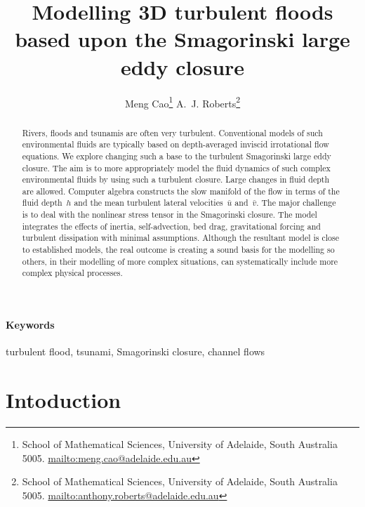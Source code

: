 \documentclass[12pt,a5paper]{article}
\title{Modelling 3D turbulent floods based upon the Smagorinski large eddy closure}
\author{Meng Cao\thanks{School of Mathematical Sciences,
University of Adelaide, South Australia 5005.  \protect\url{mailto:meng.cao@adelaide.edu.au}}
\qquad 
A.~J. Roberts\thanks{School of Mathematical Sciences,
University of Adelaide, South Australia 5005.  \protect\url{mailto:anthony.roberts@adelaide.edu.au}}}
\begin{document}
    
\maketitle

\begin{abstract}
Rivers, floods and tsunamis are often very turbulent. Conventional models of such environmental fluids are typically based on depth-averaged inviscid irrotational flow equations. We explore changing such a base to the turbulent Smagorinski large eddy closure. The aim is to more appropriately model the fluid dynamics of such complex environmental fluids by using such a turbulent closure. Large changes in fluid depth are allowed. Computer algebra constructs the slow manifold of the flow in terms of the fluid depth~$h$ and the mean turbulent lateral velocities~$\bar u$ and~$\bar v$. The major challenge is to deal with the nonlinear stress tensor in the Smagorinski closure. The model integrates the effects of inertia, self-advection, bed drag, gravitational forcing and turbulent dissipation with minimal assumptions. Although the resultant model is close to established models, the real outcome is creating a sound basis for the modelling so others, in their modelling of more complex situations, can systematically include more complex physical processes.
\end{abstract}

\paragraph{Keywords} turbulent flood, tsunami, Smagorinski closure, channel flows

\tableofcontents

\section{Intoduction}
\end{document}
